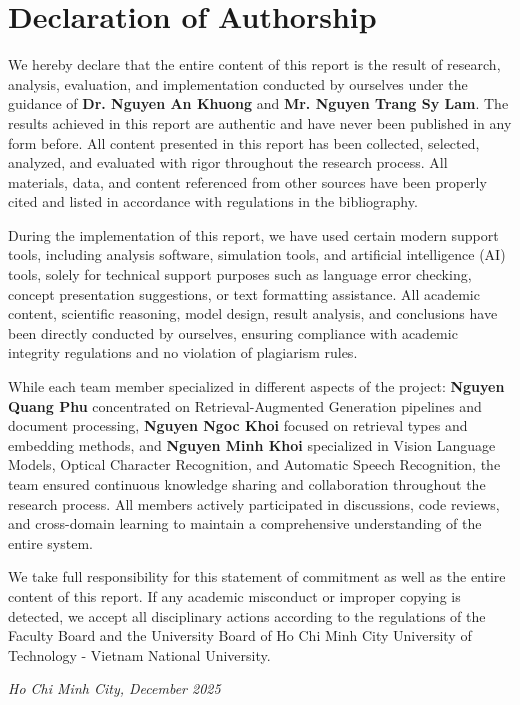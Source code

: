 \chapter*{Declaration of Authorship}

We hereby declare that the entire content of this report is the result of research, analysis, evaluation, and implementation conducted by ourselves under the guidance of \textbf{Dr. Nguyen An Khuong} and \textbf{Mr. Nguyen Trang Sy Lam}. The results achieved in this report are authentic and have never been published in any form before. All content presented in this report has been collected, selected, analyzed, and evaluated with rigor throughout the research process. All materials, data, and content referenced from other sources have been properly cited and listed in accordance with regulations in the bibliography.

During the implementation of this report, we have used certain modern support tools, including analysis software, simulation tools, and artificial intelligence (AI) tools, solely for technical support purposes such as language error checking, concept presentation suggestions, or text formatting assistance. All academic content, scientific reasoning, model design, result analysis, and conclusions have been directly conducted by ourselves, ensuring compliance with academic integrity regulations and no violation of plagiarism rules.

While each team member specialized in different aspects of the project: \textbf{Nguyen Quang Phu} concentrated on Retrieval-Augmented Generation pipelines and document processing, \textbf{Nguyen Ngoc Khoi} focused on retrieval types and embedding methods, and \textbf{Nguyen Minh Khoi} specialized in Vision Language Models, Optical Character Recognition, and Automatic Speech Recognition, the team ensured continuous knowledge sharing and collaboration throughout the research process. All members actively participated in discussions, code reviews, and cross-domain learning to maintain a comprehensive understanding of the entire system.

We take full responsibility for this statement of commitment as well as the entire content of this report. If any academic misconduct or improper copying is detected, we accept all disciplinary actions according to the regulations of the Faculty Board and the University Board of Ho Chi Minh City University of Technology - Vietnam National University.

\begin{flushright}
\textit{Ho Chi Minh City, December 2025}
\end{flushright}

\newpage
